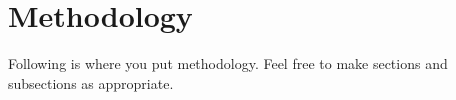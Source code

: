 \chapter{Methodology} \label{chp:chapter2}

Following is where you put methodology. Feel free to make sections and subsections as appropriate.
